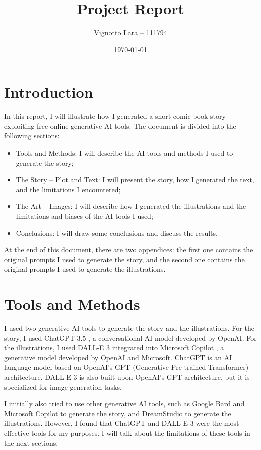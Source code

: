 \documentclass[a4paper,11pt]{article}
\title{\Huge Project Report}
\author{Vignotto Lara -- 111794}
\date{\today}
\begin{document}
\maketitle
\vspace{1cm}
\tableofcontents
\vspace{3.2cm}



\section{Introduction}
In this report, I will illustrate how I generated a short comic book story exploiting free online generative AI tools. The document is divided into the following sections:
\begin{itemize}
    \item Tools and Methods: I will describe the AI tools and methods I used to generate the story;
    \item The Story -- Plot and Text: I will present the story, how I generated the text, and the limitations I encountered;
    \item The Art -- Images: I will describe how I generated the illustrations and the limitations and biases of the AI tools I used;
    \item Conclusions: I will draw some conclusions and discuss the results.
\end{itemize}
At the end of this document, there are two appendices: the first one contains the original prompts I used to generate the story, and the second one contains the original prompts I used to generate the illustrations.



\section{Tools and Methods}
I used two generative AI tools to generate the story and the illustrations. For the story, I used ChatGPT 3.5 \cite{gpt}, a conversational AI model developed by OpenAI. For the illustrations, I used DALL-E 3 integrated into Microsoft Copilot \cite{copilot2023}, a generative model developed by OpenAI and Microsoft. 
ChatGPT is an AI language model based on OpenAI's GPT (Generative Pre-trained Transformer) architecture. DALL-E 3 is also built upon OpenAI's GPT architecture, but it is specialized for image generation tasks. 

I initially also tried to use other generative AI tools, such as Google Bard \cite{bard} and Microsoft Copilot to generate the story, and DreamStudio \cite{dreamstudio} to generate the illustrations. However, I found that ChatGPT and DALL-E 3 were the most effective tools for my purposes. I will talk about the limitations of these tools in the next sections.
\end{document}
